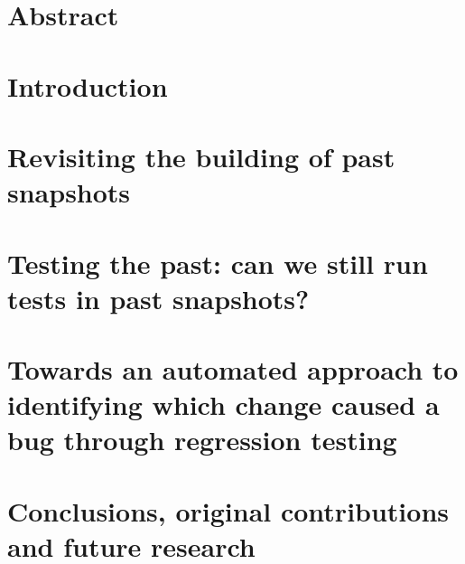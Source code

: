 \documentclass[11pt,a4paper,twoside]{book}
\begin{document}
\frontmatter





\chapter{Abstract}




\mainmatter
\restoreHeader

\chapter{Introduction}
\label{sec:intro} 
 

\chapter{Revisiting the building of past snapshots}
\label{sec:buildability-chapter}


\chapter{Testing the past: can we still run tests in past snapshots?}
\label{sec:testability-chapter}


\chapter{Towards an automated approach to identifying which change caused a bug through regression testing}
\label{sec:bug-hunter-chapter}


\chapter{Conclusions, original contributions and future research}
\label{sec:conclusions}


\backmatter

%
%



\end{document}

